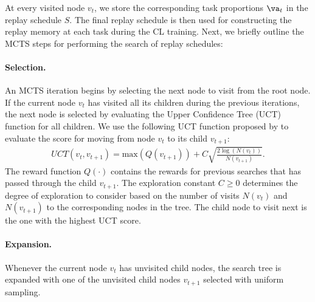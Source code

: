 At every visited node $v_t$, we store the corresponding task proportions $\va_t$ in the replay schedule $S$. The final replay schedule is then used for constructing the replay memory at each task during the CL training.  
Next, we briefly outline the MCTS steps for performing the search of replay schedules: 

\setlength{\abovedisplayskip}{0pt}
\setlength{\belowdisplayskip}{0pt}
\setlength{\abovedisplayshortskip}{0pt}
\setlength{\belowdisplayshortskip}{0pt}

\vspace{-3mm}
\paragraph{Selection.} An MCTS iteration begins by selecting the next node to visit from the root node. If the current node $v_t$ has visited all its children during the previous iterations, the next node is selected by evaluating the Upper Confidence Tree (UCT)~\citep{kocsis2006bandit} function for all children. 
We use the following UCT function proposed by \citet{chaudhry2018feature} to evaluate the score for moving from node $v_t$ to its child $v_{t+1}$:
\begin{align}\label{eq:uct}
    UCT(v_t, v_{t+1}) = \text{max}(Q(v_{t+1})) + C \sqrt{\frac{2 \log(N(v_{t}))}{N(v_{t+1})}}.
\end{align}
The reward function $Q(\cdot)$ contains the rewards for previous searches that has passed through the child $v_{t+1}$. 
The exploration constant $C \geq 0$ determines the degree of exploration to consider based on the number of visits $N(v_t)$ and $N(v_{t+1})$ to the corresponding nodes in the tree. %
The child node to visit next is the one with the highest UCT score.  

\vspace{-3mm}
\paragraph{Expansion.} Whenever the current node $v_t$ has unvisited child nodes, the search tree is expanded with one of the unvisited child nodes $v_{t+1}$ selected with uniform sampling. 


\vspace{-3mm}
